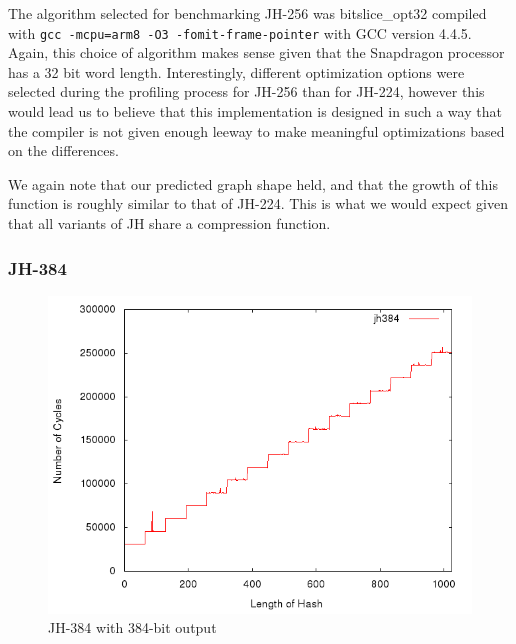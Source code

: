 The algorithm selected for benchmarking JH-256 was bitslice\_opt32 compiled with
\texttt{gcc -mcpu=arm8 -O3 -fomit-frame-pointer} with GCC version 4.4.5. Again,
this choice of algorithm makes sense given that the Snapdragon processor has a
32 bit word length. Interestingly, different optimization options were selected
during the profiling process for JH-256 than for JH-224, however this would lead
us to believe that this implementation is designed in such a way that the
compiler is not given enough leeway to make meaningful optimizations based on
the differences.

We again note that our predicted graph shape held, and that the growth of this
function is roughly similar to that of JH-224. This is what we would expect
given that all variants of JH share a compression function.


\subsubsection{JH-384}
\begin{figure}[H]
    \begin{center}
        \includegraphics[scale=0.5]{images/jh384.png} 
        \caption{JH-384 with 384-bit output}
    \end{center}
\end{figure}



